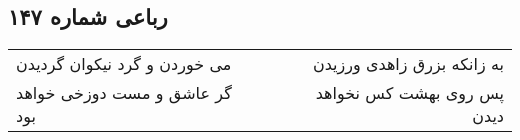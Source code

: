 \begin{center}
\section*{رباعی شماره ۱۴۷}
\label{sec:sh147}
\begin{longtable}{l p{0.5cm} r}
می خوردن و گرد نیکوان گردیدن
&&
به زانکه بزرق زاهدی ورزیدن
\\
گر عاشق و مست دوزخی خواهد بود
&&
پس روی بهشت کس نخواهد دیدن
\\
\end{longtable}
\end{center}
